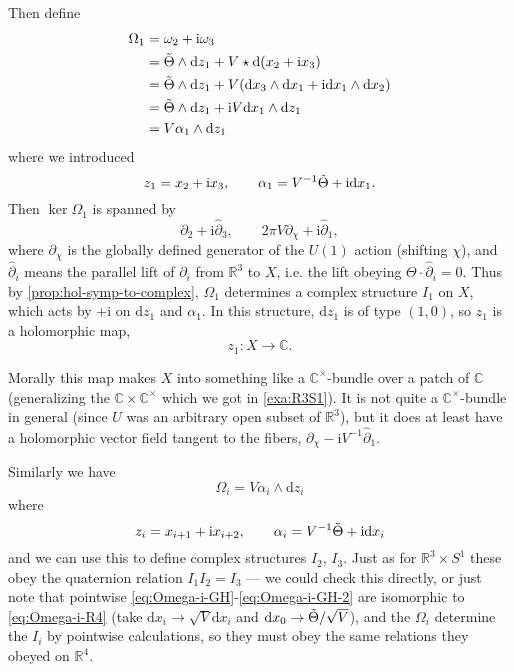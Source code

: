 \documentclass[12pt,letterpaper,reqno]{article}
\numberwithin{equation}{section}
\newcommand{\R}{\ensuremath{\mathbb R}}
\newcommand{\C}{\ensuremath{\mathbb C}}
\newcommand{\I}{{\mathrm i}}
\newcommand{\de}{\mathrm{d}}
\begin{document}
\begin{example}
Then define
\begin{align}
  \Omega_1 &= \omega_2 + \I \omega_3 \\
  &= \tTheta \wedge \de z_1 +  V \star \de(x_2 + \I x_3)\\
  &= \tTheta \wedge \de z_1 +  V (\de x_3 \wedge \de x_1 + \I \de x_1 \wedge \de x_2)\\
  &= \tTheta \wedge \de z_1 + \I V \de x_1 \wedge \de z_1 \\
  &= V \alpha_1 \wedge \de z_1
\end{align}
where we introduced
\begin{equation} \label{eq:hol-forms-GH}
  z_1 = x_2 + \I x_3, \qquad 
  \alpha_1 = V^{-1} \tTheta + \I \de x_1.
\end{equation}
Then $\ker \Omega_1$ is spanned by
\begin{equation} \label{eq:gibbons-hawking-01-vectors}
 \hat\partial_2 + \I \hat\partial_3, \qquad 2 \pi V \partial_\chi + \I \hat\partial_1,  
\end{equation}
 where $\partial_\chi$ 
is the globally defined generator of the $U(1)$ action 
(shifting $\chi$),  and $\hat \partial_i$ means
the parallel lift of $\partial_i$ from $\R^3$ to $X$, i.e. the lift
obeying $\Theta \cdot \hat\partial_i = 0$. Thus
by \autoref{prop:hol-symp-to-complex}, $\Omega_1$ 
determines a complex structure $I_1$ on $X$, which acts
by $+\I$ on $\de z_1$ and $\alpha_1$.
In this structure, $\de z_1$ is of type $(1,0)$, so
$z_1$ is a holomorphic map,
\begin{equation}
  z_1: X \to \C.
\end{equation}

Morally this map makes $X$ into something like 
a $\C^\times$-bundle over a patch of $\C$ (generalizing
the $\C\times\C^\times$ which we got in \autoref{exa:R3S1}).
It is not quite a $\C^\times$-bundle in general
(since $U$ was an arbitrary open subset of $\R^3$), 
but it does at least have 
a holomorphic vector field tangent to the fibers,
$\partial_\chi - \I V^{-1} \hat \partial_1$.

Similarly we have
\begin{equation} \label{eq:Omega-i-GH}
  \Omega_i = V \alpha_i \wedge \de z_i
\end{equation}
where
\begin{equation} \label{eq:Omega-i-GH-2}
  z_i = x_{i+1} + \I x_{i+2}, \qquad \alpha_i = V^{-1} \tTheta + \I \de x_i
\end{equation}
and we can use this to define complex structures $I_2$, $I_3$.
Just as for $\R^3 \times S^1$ these obey the quaternion
relation $I_1 I_2 = I_3$ --- we could check this directly, 
or just note that pointwise \eqref{eq:Omega-i-GH}-\eqref{eq:Omega-i-GH-2}
are isomorphic to \eqref{eq:Omega-i-R4}
(take $\de x_i \to \sqrt{V} \de x_i$ and $\de x_0 \to \tTheta / \sqrt{V}$),
and the $\Omega_i$ determine the $I_i$ by pointwise calculations,
so they must obey the same relations they obeyed on $\R^4$.


\end{example}
\end{document}
